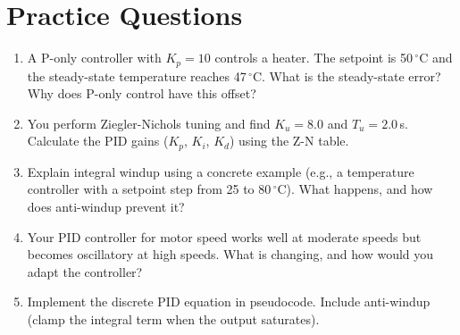 \documentclass[11pt,letterpaper,twoside,openany]{book}
\newcommand{\degC}{\ensuremath{{}^{\circ}\text{C}}}
\begin{document}
\section{Practice Questions}
\begin{enumerate}[leftmargin=1.5em]
\item A P-only controller with $K_p = 10$ controls a heater. The setpoint is 50\,\degC{} and the steady-state temperature reaches 47\,\degC{}. What is the steady-state error? Why does P-only control have this offset?
\item You perform Ziegler-Nichols tuning and find $K_u = 8.0$ and $T_u = 2.0$\,s. Calculate the PID gains ($K_p$, $K_i$, $K_d$) using the Z-N table.
\item Explain integral windup using a concrete example (e.g., a temperature controller with a setpoint step from 25 to 80\,\degC{}). What happens, and how does anti-windup prevent it?
\item Your PID controller for motor speed works well at moderate speeds but becomes oscillatory at high speeds. What is changing, and how would you adapt the controller?
\item Implement the discrete PID equation in pseudocode. Include anti-windup (clamp the integral term when the output saturates).
\end{enumerate}
\end{document}
